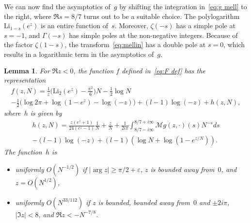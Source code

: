 \documentclass[a4paper]{amsart}
\newtheorem{lemma}[theorem]{Lemma}
\begin{document}
%
We can now find the asymptotics of~$g$ by shifting the integration
in~\eqref{eq:g mell} to the right, where $\Re s =8/7$ turns out to
be a suitable choice.
The polylogarithm $\mathrm{Li}_{1-s}(e^z)$ is an entire function of~$s$.
Moreover, $\zeta(-s)$ has a simple pole at $s=-1$, and $\Gamma(-s)$ has simple
poles at the non-negative integers. Because of the factor $\zeta(1-s)$, the
transform~\eqref{eq:mellin} has a double pole at  $s=0$, which results in
a logarithmic term in the asymptotics of~$g$.
%
\begin{lemma}\label{le:mellin}
  For $\Re z<0$, the function $f$ defined in~\eqref{eq:F def} has the representation
  \begin{multline}\label{eq:f asympt}
     f(z,N) = \frac{1}{z}\Big( \mathrm{Li}_2(e^z) - \frac{\pi^2}{6}\Big)N
   - \frac12 \log N  \\
    - \frac12 \Big(\log 2\pi    +\log(1-e^{z})
 - \log(-z)\Big) +(l-1)\log(-z)+ h(z,N),
 \end{multline}
  where~$h$ is given by
  \begin{multline}\label{eq:h}
    h(z,N) =  \frac{z(e^z+1)}{24(e^z-1)} \frac1N +\frac{z}{N}
      + \frac{1}{2i\pi}\int_{8/7-i\infty}^{8/7+i\infty}  \mathcal{M}g(z,\cdot)(s) N^{-s} ds \\
                -(l-1) \log(-z) + (l-1) (\log N + \log (1-e^{z/N})). 
  \end{multline}
  The function~$h$ is
  \begin{itemize}
    \item[(i)] uniformly $O(N^{-1/2})$ if $|\arg z|\geq \pi/2+\varepsilon$, $z$ is  bounded away
      from~$0$, and $z=O(N^{1/2})$,
    \item[(ii)] uniformly $O(N^{33/112})$ if $z$ is bounded, bounded away from~$0$ and $\pm 2i\pi$,
      $|\Im z|<8$, and $\Re z < -N^{-7/8}$.
  \end{itemize}
\end{lemma}
\end{document}
